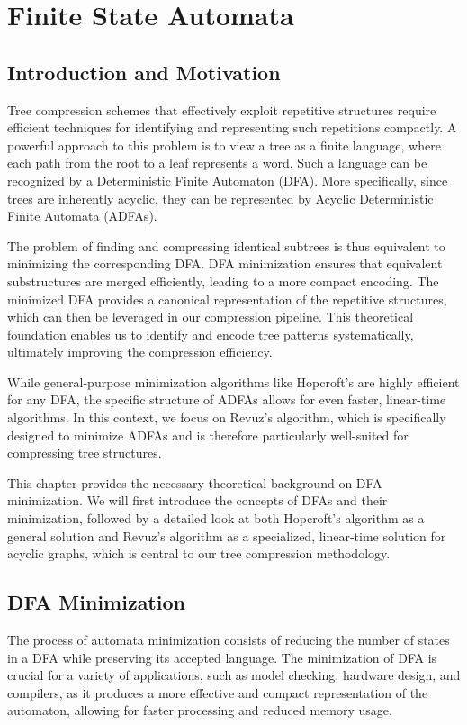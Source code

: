 \section{Finite State Automata} \label{chp:hopcroft}

\subsection{Introduction and Motivation}
Tree compression schemes that effectively exploit repetitive structures require efficient techniques for identifying and representing such repetitions compactly. A powerful approach to this problem is to view a tree as a finite language, where each path from the root to a leaf represents a word. Such a language can be recognized by a Deterministic Finite Automaton (DFA). More specifically, since trees are inherently acyclic, they can be represented by Acyclic Deterministic Finite Automata (ADFAs).

The problem of finding and compressing identical subtrees is thus equivalent to minimizing the corresponding DFA. DFA minimization ensures that equivalent substructures are merged efficiently, leading to a more compact encoding. The minimized DFA provides a canonical representation of the repetitive structures, which can then be leveraged in our compression pipeline. This theoretical foundation enables us to identify and encode tree patterns systematically, ultimately improving the compression efficiency.

While general-purpose minimization algorithms like Hopcroft's are highly efficient for any DFA, the specific structure of ADFAs allows for even faster, linear-time algorithms. In this context, we focus on Revuz's algorithm, which is specifically designed to minimize ADFAs and is therefore particularly well-suited for compressing tree structures.

This chapter provides the necessary theoretical background on DFA minimization. We will first introduce the concepts of DFAs and their minimization, followed by a detailed look at both Hopcroft's algorithm as a general solution and Revuz's algorithm as a specialized, linear-time solution for acyclic graphs, which is central to our tree compression methodology.

\subsection{DFA Minimization}
The process of automata minimization consists of reducing the number of states in a DFA while preserving its accepted language. The minimization of DFA is crucial for a variety of applications, such as model checking, hardware design, and compilers, as it produces a more effective and compact representation of the automaton, allowing for faster processing and reduced memory usage.

